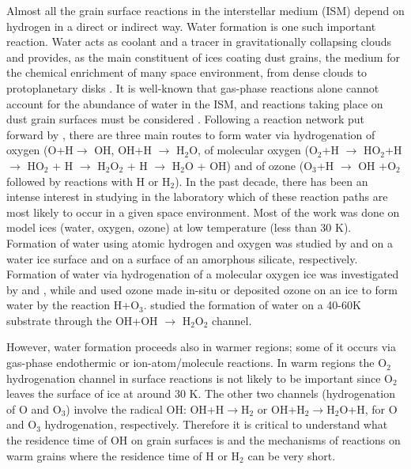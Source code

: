 \documentclass[iop]{emulateapj}
\begin{document}
Almost all the grain surface reactions in the interstellar medium (ISM) depend on hydrogen in a direct or indirect way. Water formation is one such important reaction. Water acts as coolant and a tracer in gravitationally collapsing clouds \citep{Neufeld1995,Mottram2013} and provides, as the main constituent of ices coating dust grains, the medium for the chemical enrichment of many space environment, from dense clouds to protoplanetary disks \citep{Kristensen2011,Hogerheijde2011}. It is well-known that gas-phase reactions alone cannot account for the abundance of water in the ISM, and reactions taking place on dust grain surfaces must be considered \citep{Hasegawa1992,Roberts2002}.  Following a reaction network put forward by  \citet{Tielens1982}, there are three main routes to form water via hydrogenation of oxygen (O+H$\rightarrow$ OH, OH+H $\rightarrow$ H$_2$O, of molecular oxygen (O$_2$+H $\rightarrow$ HO$_2$+H $\rightarrow$ HO$_2$ + H $\rightarrow$ H$_2$O$_2$ + H $\rightarrow$ H$_2$O + OH) and of ozone (O$_3$+H $\rightarrow $ OH +O$_2$ followed by reactions with H or H$_2$). In the past decade, there has been an intense interest in studying in the laboratory which of these reaction paths are most likely to occur in a given space environment. Most of the work was done on model ices (water, oxygen, ozone) at low temperature (less than 30 K). Formation of water using atomic hydrogen and oxygen was studied by \citet{Dulieu2010} and \citet{Jing2011} on a water ice surface and on a surface of an amorphous silicate, respectively. Formation of water via hydrogenation of a molecular oxygen ice was investigated by \citet{Ioppolo2008} and \citet{Miyauchi2008}, while \citet{Romanzin2011} and  \citet{Mokrane2009} used ozone made in-situ or deposited ozone on an ice to form water by the reaction H+O$_3$. \citet{Oba2011} studied the formation of water on a 40-60K substrate through the OH+OH $\rightarrow$ H$_2$O$_2$ channel.
 
However, water formation proceeds also in warmer regions; some of it occurs via gas-phase  endothermic or ion-atom/molecule reactions\citep{Glassgold2009,Hollenbach2012}. In warm regions the O$_2$ hydrogenation channel in surface reactions is not likely to be important since O$_2$ leaves the surface of ice at around 30 K. The other two channels (hydrogenation of O and O$_3$) involve the radical OH:  OH+H$\rightarrow$H$_2$ or OH+H$_2\rightarrow$H$_2$O+H, for O and O$_3$ hydrogenation, respectively. Therefore it is critical to understand what  the residence time of OH on grain surfaces is and the mechanisms of reactions on warm grains where the residence time of H or H$_2$ can be very short. 
\end{document}
